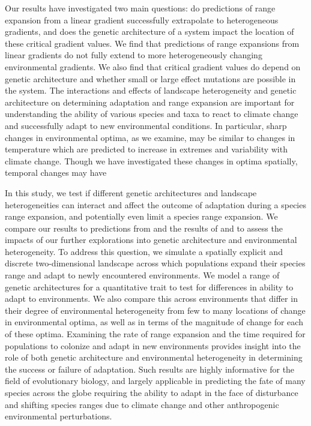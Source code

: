 Our results have investigated two main questions: do predictions of range expansion from a linear gradient successfully extrapolate to heterogeneous gradients, and does the genetic architecture of a system impact the location of these critical gradient values. We find that predictions of range expansions from linear gradients do not fully extend to more heterogeneously changing environmental gradients. We also find that critical gradient values do depend on genetic architecture and whether small or large effect mutations are possible in the system. The interactions and effects of landscape heterogeneity and genetic architecture on determining adaptation and range expansion are important for understanding the ability of various species and taxa to react to climate change and successfully adapt to new environmental conditions. In particular, sharp changes in environmental optima, as we examine, may be similar to changes in temperature which are predicted to increase in extremes and variability with climate change. Though we have investigated these changes in optima spatially, temporal changes may have



In this study, we test if different genetic architectures and landscape heterogeneities can interact and affect the outcome of adaptation during a species range expansion, and potentially even limit a species range expansion. We compare our results to predictions from \citet{Barton:2001} and the results of \citet{Bridle:2010} and \citet{Schiffers:2014} to assess the impacts of our further explorations into genetic architecture and environmental heterogeneity. 
To address this question, we simulate a spatially explicit and discrete two-dimensional landscape across which populations expand their species range and adapt to newly encountered environments. We model a range of genetic architectures for a quantitative trait to test for differences in ability to adapt to environments. We also compare this across environments that differ in their degree of environmental heterogeneity from few to many locations of change in environmental optima, as well as in terms of the magnitude of change for each of these optima. Examining the rate of range expansion and the time required for populations to colonize and adapt in new environments provides insight into the role of both genetic architecture and environmental heterogeneity in determining the success or failure of adaptation. Such results are highly informative for the field of evolutionary biology, and largely applicable in predicting the fate of many species across the globe requiring the ability to adapt in the face of disturbance and shifting species ranges due to climate change and other anthropogenic environmental perturbations.


